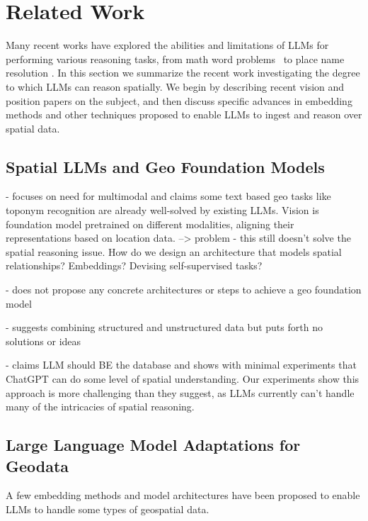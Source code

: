 \section{Related Work}
\label{section:related}
\normalsize

Many recent works have explored the abilities and limitations of LLMs for performing various reasoning tasks, from math word problems~\cite{Gao2023, Badaro2023} to place name resolution \cite{Mai2023}.
In this section we summarize the recent work investigating the degree to which LLMs can reason spatially.
We begin by describing recent vision and position papers on the subject, and then discuss specific advances in embedding methods and other techniques proposed to enable LLMs to ingest and reason over spatial data.


\subsection{Spatial LLMs and Geo Foundation Models}

\cite{Mai2023} - focuses on need for multimodal and claims some text based geo tasks like toponym recognition are already well-solved by existing LLMs.
Vision is foundation model pretrained on different modalities, aligning their representations based on location data.
--> problem - this still doesn't solve the spatial reasoning issue. How  do we design an architecture that models spatial relationships? Embeddings? Devising self-supervised tasks?

\cite{Xie2023} - does not propose any concrete architectures or steps to achieve a geo foundation model

\cite{Tan2023} - suggests combining structured and unstructured data but puts forth no solutions or ideas

\cite{Qi2023} - claims LLM should BE the database and shows with minimal experiments that ChatGPT can do some level of spatial understanding. 
Our experiments show this approach is more challenging than they suggest, as LLMs currently can't handle many of the intricacies of spatial reasoning.





\subsection{Large Language Model Adaptations for Geodata}
A few embedding methods and model architectures have been proposed to enable LLMs to handle some types of geospatial data.

